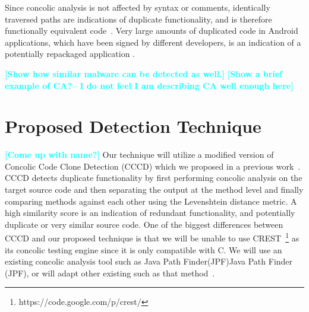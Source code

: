 \documentclass{sig-alternate}
\newcommand{\todo}[1]{\textcolor{cyan}{\textbf{[#1]}}}
\begin{document}






Since concolic analysis is not affected by syntax or comments, identically traversed paths are indications of duplicate functionality, and is therefore functionally equivalent code~\cite{krutz2013cccd,krutz2013code}. Very large amounts of duplicated code in Android applications, which have been signed by different developers, is an indication of a potentially repackaged application .





\cite{qin2014detecting}


\todo{Show how similar malware can be detected as well.}
\todo{Show a brief example of CA?-- I do not feel I am describing CA well enough here}





\section{Proposed Detection Technique}



\todo{Come up with name?}
Our technique will utilize a modified version of Concolic Code Clone Detection (CCCD) which we proposed in a previous work~\cite{krutz2013cccd}. CCCD detects duplicate functionality by first performing concolic analysis on the target source code and then separating the output at the method level and  finally comparing methods against each other using the Levenshtein distance metric. A high similarity score is an indication of redundant functionality, and potentially duplicate or very similar source code. One of the biggest differences between CCCD and our proposed technique is that we will be unable to use CREST~\footnote{https://code.google.com/p/crest/} as its concolic testing engine since it is only compatible with C. We will use an existing concolic analysis tool such as Java Path Finder(JPF)Java Path Finder (JPF)\cite{Visser:2004:TIG:1013886.1007526}, or will adapt other existing such as that method~\cite{Anand:2012:ACT:2393596.2393666}.
\end{document}
